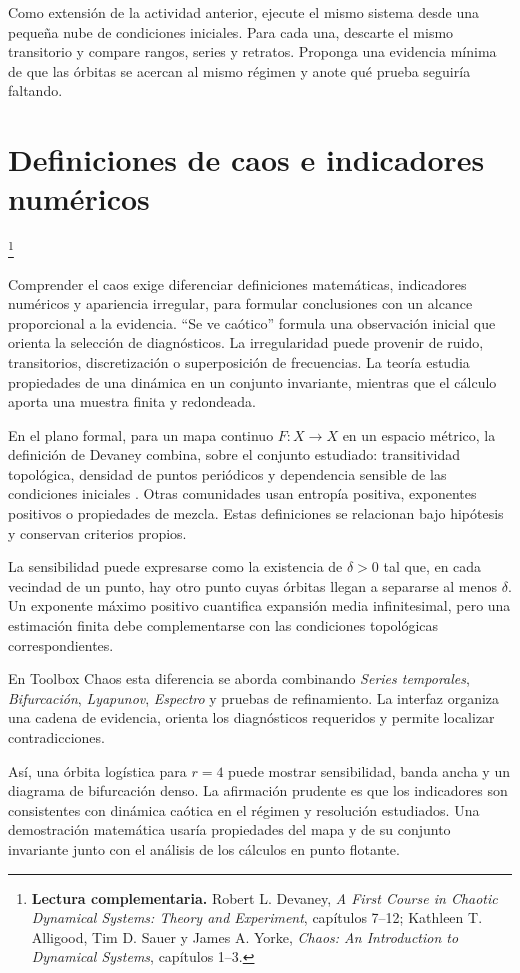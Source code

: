 \documentclass[11pt,a4paper]{article}
\newcommand{\gui}[1]{\textsf{\emph{#1}}}
\newcommand{\lecturaseccion}[1]{%
  \par\noindent{\sffamily\scriptsize\color{Teal}Lectura complementaria}\footnote{%
  \textbf{Lectura complementaria.} #1}\par}
\begin{document}
Como extensión de la actividad anterior, ejecute el mismo sistema desde una pequeña
nube de condiciones iniciales. Para cada
una, descarte el mismo transitorio y compare rangos, series y retratos. Proponga una
evidencia mínima de que las órbitas se acercan al mismo régimen y anote qué prueba
seguiría faltando.

\section{Definiciones de caos e indicadores numéricos}
\lecturaseccion{Robert L. Devaney, \emph{A First Course in Chaotic Dynamical Systems: Theory and Experiment}, capítulos 7--12; Kathleen T. Alligood, Tim D. Sauer y James A. Yorke, \emph{Chaos: An Introduction to Dynamical Systems}, capítulos 1--3.}

Comprender el caos exige diferenciar definiciones matemáticas, indicadores numéricos y
apariencia irregular, para formular conclusiones con un alcance proporcional a la
evidencia. ``Se ve caótico'' formula una observación inicial que orienta la selección
de diagnósticos. La irregularidad puede provenir de ruido, transitorios, discretización
o superposición de frecuencias. La teoría estudia propiedades de una dinámica en un
conjunto invariante, mientras que el cálculo aporta una muestra finita y redondeada.

En el plano formal, para un mapa continuo $F:X\to X$ en un espacio métrico, la
definición de Devaney
combina, sobre el conjunto estudiado: transitividad topológica, densidad de puntos
periódicos y dependencia sensible de las condiciones iniciales \cite{devaney1989}.
Otras comunidades usan entropía positiva, exponentes positivos o propiedades de
mezcla. Estas definiciones se relacionan bajo hipótesis y conservan criterios propios.

La sensibilidad puede expresarse como la existencia de $\delta>0$ tal que, en cada
vecindad de un punto, hay otro punto cuyas órbitas llegan a separarse al menos
$\delta$. Un exponente máximo positivo cuantifica expansión media infinitesimal,
pero una estimación finita debe complementarse con las condiciones topológicas correspondientes.

En Toolbox Chaos esta diferencia se aborda combinando \gui{Series temporales},
\gui{Bifurcación}, \gui{Lyapunov},
\gui{Espectro} y pruebas de refinamiento. La interfaz organiza una cadena de evidencia,
orienta los diagnósticos requeridos y permite localizar contradicciones.

Así, una órbita logística para $r=4$ puede mostrar sensibilidad, banda ancha y un
diagrama de bifurcación denso. La afirmación prudente es que los indicadores son
consistentes con dinámica caótica en el régimen y resolución estudiados. Una
demostración matemática usaría propiedades del mapa y de su conjunto invariante junto
con el análisis de los cálculos en punto flotante.
\end{document}
